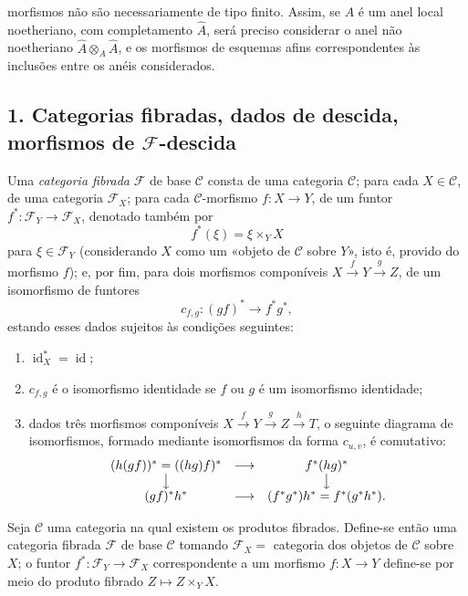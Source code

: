 morfismos não são necessariamente de tipo finito. Assim, se $A$ é um anel local
noetheriano, com completamento $\widehat A$, será preciso considerar o anel não
noetheriano $\widehat A\otimes_A\widehat A$, e os morfismos de esquemas afins
correspondentes às inclusões entre os anéis considerados.


\subsection*{1. Categorias fibradas, dados de descida, morfismos de
$\mathcal F$-descida}

 Uma \emph{categoria fibrada} $\mathcal F$ de base
$\mathcal C$ consta de uma categoria $\mathcal C$; para cada
$X\in\mathcal C$, de uma categoria $\mathcal F_X$; para cada
$\mathcal C$-morfismo $f:X\longrightarrow Y$, de um funtor
$f^*:\mathcal F_Y\longrightarrow\mathcal F_X$, denotado também por
\[
  f^*(\xi)=\xi\times_Y X
\]
para $\xi\in\mathcal F_Y$ (considerando $X$ como um «objeto de
$\mathcal C$ sobre $Y$», isto é, provido do morfismo $f$); e, por fim,
para dois morfismos componíveis
$X\xrightarrow{f}Y\xrightarrow{g}Z$, de um isomorfismo de funtores
\[
  c_{f,g}:(gf)^*\longrightarrow f^*g^*,
\]
estando esses dados sujeitos às condições seguintes:

\begin{enumerate}
\item[(i)] $\operatorname{id}_X^*=\operatorname{id}$;
\item[(ii)] $c_{f,g}$ é o isomorfismo identidade se $f$ ou $g$ é um
isomorfismo identidade;
\item[(iii)] dados três morfismos componíveis
$X\xrightarrow{f}Y\xrightarrow{g}Z\xrightarrow{h}T$, o seguinte diagrama de
isomorfismos, formado mediante isomorfismos da forma $c_{u,v}$, é
comutativo:
\[
\begin{array}{ccc}
  (h(gf))^*=((hg)f)^* & \longrightarrow & f^*(hg)^* \\
  \big\downarrow && \big\downarrow \\
  (gf)^*h^* & \longrightarrow & (f^*g^*)h^*=f^*(g^*h^*).
\end{array}
\]
\end{enumerate}

 Seja $\mathcal C$ uma categoria na qual existem os
produtos fibrados. Define-se então uma categoria fibrada $\mathcal F$ de
base $\mathcal C$ tomando $\mathcal F_X=$ categoria dos objetos de
$\mathcal C$ sobre $X$; o funtor
$f^*:\mathcal F_Y\longrightarrow\mathcal F_X$ correspondente a um morfismo
$f:X\longrightarrow Y$ define-se por meio do produto fibrado
$Z\longmapsto Z\times_YX$.

